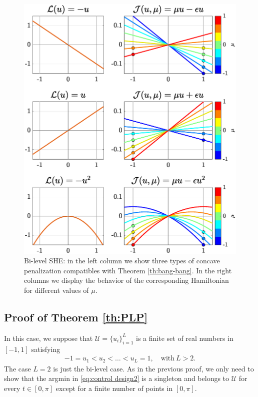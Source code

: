 \documentclass[twocolumn]{autart}    %
\begin{document}
\begin{figure}[h] 
	\centering
	\includegraphics[scale=0.415]{img/fig03.eps}
	\caption{Bi-level SHE: in the left column we show three types of concave penalization compatibles with Theorem \ref{th:bang-bang}. In the right columns we display the behavior of the corresponding Hamiltonian for different values of $\mu$.}\label{fig:Bang-Bang-penalization} 
\end{figure}

  
\subsection{Proof of Theorem \ref{th:PLP}}\label{proof:PLP}

In this case, we suppose that $\mathcal{U} = \{ u_i\}_{i=1}^L$ is a finite set of real numbers in $[-1,1]$ satisfying
\begin{align*} 
	-1 = u_1 < u_2 <\ldots <u_L = 1, \quad \text{with} \ L> 2.
\end{align*} 
The case $L=2$ is just the bi-level case. As in the previous proof, we only need to show that the argmin in \eqref{eq:control design2} is a singleton and belongs to $\mathcal{U}$ for every $t\in [0,\pi]$ except for a finite number of points in $[0,\pi]$.
\end{document}
